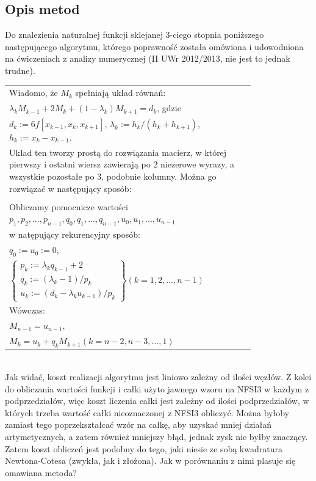 \documentclass[11pt,wide]{mwart}
\begin{document}
\subsection{Opis metod}
Do znalezienia naturalnej funkcji sklejanej 3-ciego stopnia poniższego następującego algorytmu, którego poprawność została omówiona i udowodniona na ćwiczeniach z analizy numerycznej (II UWr 2012/2013, nie jest to jednak trudne).
\begin{table}[!h]
  \centering
  \begin{tabular}{|p{0.8\linewidth}|}
    \hline
    Wiadomo, że $M_k$ spełniają układ równań:\\
    $
    \lambda_kM_{k-1} + 2M_k + (1-\lambda_k)M_{k+1} = d_k
    $, gdzie\\
    $d_k:=6f[x_{k-1},x_k,x_{k+1}]$, $\lambda_k:=h_k/(h_k+h_{k+1})$,$h_k:=x_k- x_{k-1}$.\\
    Układ ten tworzy prostą do rozwiązania macierz, w której pierwszy i ostatni wiersz zawierają po 2 niezerowe wyrazy, a wszystkie pozostałe po 3, podobnie kolumny. Można go rozwiązać w następujący sposób:\\\\
    \hline
    Obliczamy pomocnicze wartości $p_1,p_2,...,p_{n-1}, q_0,q_1,...,q_{n-1}, u_0,u_1,...,u_{n-1}$\\ w natępujący rekurencyjny sposób:\\
    $q_0:=u_0:=0$,\\
    \begin{math}
      \left\{ 
      \begin{array}{l}
        p_k:=\lambda_kq_{k-1}+2 \\
        q_k:=(\lambda_k-1)/p_k \\
        u_k:=(d_k-\lambda_ku_{k-1})/p_k
      \end{array} 
    \right\} (k=1,2,...,n-1)
    \end{math}
    \\Wówczas:\\
    $M_{n-1}=u_{n-1},$\\$M_k=u_k+q_kM_{k+1} (k=n-2,n-3,...,1)$
    \\\hline
  \end{tabular}
\end{table}
\\\indent
Jak widać, koszt realizacji algorytmu jest liniowo zależny od ilości węzłów. Z kolei do obliczania wartości funkcji i całki użyto jawnego wzoru na NFSI3 w każdym z podprzedziałów, więc koszt liczenia całki jest zależny od ilości podprzedziałów, w których trzeba wartość całki nieoznaczonej z NFSI3 obliczyć. Można byłoby zamiast tego poprzekształcać wzór na całkę, aby uzyskać mniej działań artymetycznych, a zatem również mniejszy błąd, jednak zysk nie byłby znaczący. 
Zatem koszt obliczeń jest podobny do tego, jaki niesie ze sobą kwadratura Newtona-Cotesa (zwykła, jak i złożona). Jak w porównaniu z nimi plasuje się omawiana metoda?
\end{document}
